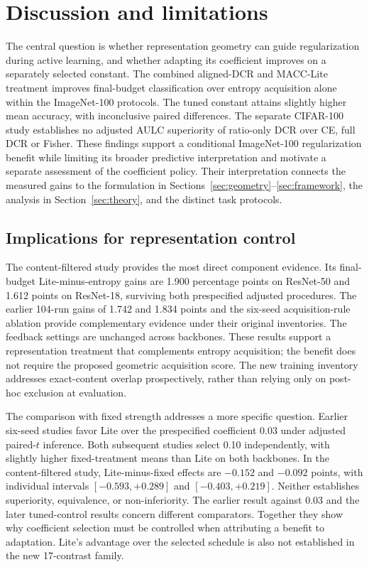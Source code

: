 \documentclass[10pt,a4paper,twocolumn]{article}
\begin{document}
\section{Discussion and limitations}\label{sec:discussion}

The central question is whether representation geometry can guide
regularization during active learning, and whether adapting its
coefficient improves on a separately selected constant. The combined aligned-DCR and MACC-Lite treatment improves
final-budget classification over entropy acquisition alone within the
ImageNet-100 protocols. The tuned
constant attains slightly higher mean accuracy, with inconclusive paired
differences. The separate CIFAR-100 study establishes no adjusted
AULC superiority of ratio-only DCR over CE, full DCR or Fisher.
These findings support a conditional ImageNet-100 regularization
benefit while limiting its broader predictive interpretation and motivate a separate assessment of the
coefficient policy. Their interpretation connects the measured gains to the formulation
in Sections~\ref{sec:geometry}--\ref{sec:framework}, the analysis in
Section~\ref{sec:theory}, and the distinct task protocols.

\subsection{Implications for representation control}\label{sec:interpretation}

The content-filtered study provides the most direct component evidence.
Its final-budget Lite-minus-entropy gains are 1.900 percentage points
on ResNet-50 and 1.612 points on ResNet-18, surviving both prespecified
adjusted procedures. The earlier 104-run gains of 1.742 and 1.834 points
and the six-seed acquisition-rule ablation provide complementary
evidence under their original inventories. The feedback settings are
unchanged across backbones. These results support a representation
treatment that complements entropy acquisition; the benefit does not
require the proposed geometric acquisition score. The new training
inventory addresses exact-content overlap prospectively, rather than
relying only on post-hoc exclusion at evaluation.

The comparison with fixed strength addresses a more specific question.
Earlier six-seed studies favor Lite over the prespecified coefficient
0.03 under adjusted paired-$t$ inference. Both subsequent studies select
0.10 independently, with slightly higher fixed-treatment means than
Lite on both backbones. In the content-filtered study, Lite-minus-fixed
effects are $-0.152$ and $-0.092$ points, with individual intervals
$[-0.593,+0.289]$ and $[-0.403,+0.219]$. Neither establishes superiority,
equivalence, or non-inferiority. The earlier result against 0.03 and the
later tuned-control results concern different comparators. Together they
show why coefficient selection must be controlled when attributing a
benefit to adaptation. Lite's advantage over the selected schedule is
also not established in the new 17-contrast family.
\end{document}
